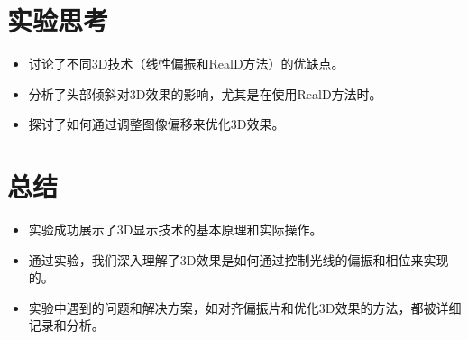 \documentclass{ctexart}
\begin{document}
\section{实验思考}
\begin{itemize}
    \item 讨论了不同3D技术（线性偏振和RealD方法）的优缺点。
    \item 分析了头部倾斜对3D效果的影响，尤其是在使用RealD方法时。
    \item 探讨了如何通过调整图像偏移来优化3D效果。
\end{itemize}

\section{总结}
\begin{itemize}
    \item 实验成功展示了3D显示技术的基本原理和实际操作。
    \item 通过实验，我们深入理解了3D效果是如何通过控制光线的偏振和相位来实现的。
    \item 实验中遇到的问题和解决方案，如对齐偏振片和优化3D效果的方法，都被详细记录和分析。
\end{itemize}
\end{document}
